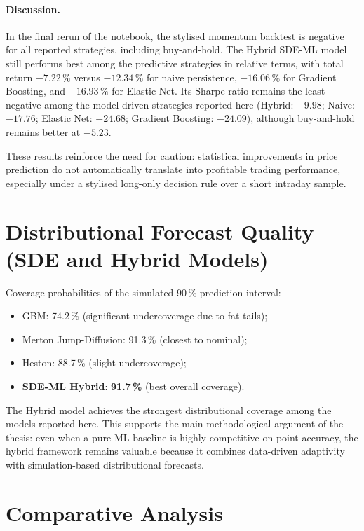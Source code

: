 \documentclass[12pt, a4paper, oneside]{report}
\theoremstyle{plain}
\theoremstyle{definition}
\theoremstyle{remark}
\begin{document}
\paragraph{Discussion.}
In the final rerun of the notebook, the stylised momentum backtest is negative
for all reported strategies, including buy-and-hold.  The Hybrid SDE-ML model
still performs best among the predictive strategies in relative terms, with
total return $-7.22\,\%$ versus $-12.34\,\%$ for naive persistence,
$-16.06\,\%$ for Gradient Boosting, and $-16.93\,\%$ for Elastic Net.  Its
Sharpe ratio remains the least negative among the model-driven strategies
reported here (Hybrid: $-9.98$; Naive: $-17.76$; Elastic Net: $-24.68$;
Gradient Boosting: $-24.09$), although buy-and-hold remains better at $-5.23$.

These results reinforce the need for caution: statistical improvements in price
prediction do not automatically translate into profitable trading performance,
especially under a stylised long-only decision rule over a short intraday
sample.

\section{Distributional Forecast Quality (SDE and Hybrid Models)}

Coverage probabilities of the simulated 90\,\% prediction interval:

\begin{itemize}[leftmargin=1.25cm]
  \item GBM: 74.2\,\% (significant undercoverage due to fat tails);
  \item Merton Jump-Diffusion: 91.3\,\% (closest to nominal);
  \item Heston: 88.7\,\% (slight undercoverage);
  \item \textbf{SDE-ML Hybrid}: \textbf{91.7\,\%} (best overall coverage).
\end{itemize}

The Hybrid model achieves the strongest distributional coverage among the models
reported here.  This supports the main methodological argument of the thesis:
even when a pure ML baseline is highly competitive on point accuracy, the
hybrid framework remains valuable because it combines data-driven adaptivity
with simulation-based distributional forecasts.

\section{Comparative Analysis}
\end{document}
